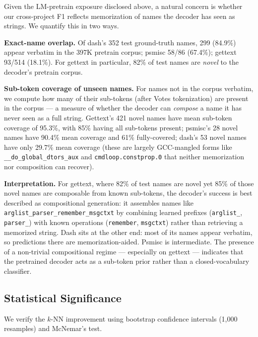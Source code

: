 \documentclass[sigconf,nonacm]{acmart}
\begin{document}
Given the LM-pretrain exposure disclosed above, a natural concern is whether our cross-project F1 reflects memorization of names the decoder has seen as strings. We quantify this in two ways.

\textbf{Exact-name overlap.} Of dash's 352 test ground-truth names, 299 (84.9\%) appear verbatim in the 397K pretrain corpus; psmisc 58/86 (67.4\%); gettext 93/514 (18.1\%). For gettext in particular, 82\% of test names are \emph{novel} to the decoder's pretrain corpus.

\textbf{Sub-token coverage of unseen names.} For names not in the corpus verbatim, we compute how many of their sub-tokens (after Votes tokenization) are present in the corpus --- a measure of whether the decoder can \emph{compose} a name it has never seen as a full string. Gettext's 421 novel names have mean sub-token coverage of 95.3\%, with 85\% having all sub-tokens present; psmisc's 28 novel names have 90.4\% mean coverage and 61\% fully-covered; dash's 53 novel names have only 29.7\% mean coverage (these are largely GCC-mangled forms like \texttt{\_\_do\_global\_dtors\_aux} and \texttt{cmdloop.constprop.0} that neither memorization nor composition can recover).

\textbf{Interpretation.} For gettext, where 82\% of test names are novel yet 85\% of those novel names are composable from known sub-tokens, the decoder's success is best described as compositional generation: it assembles names like \texttt{arglist\_parser\_remember\_msgctxt} by combining learned prefixes (\texttt{arglist\_}, \texttt{parser\_}) with known operations (\texttt{remember}, \texttt{msgctxt}) rather than retrieving a memorized string. Dash sits at the other end: most of its names appear verbatim, so predictions there are memorization-aided. Psmisc is intermediate. The presence of a non-trivial compositional regime --- especially on gettext --- indicates that the pretrained decoder acts as a sub-token prior rather than a closed-vocabulary classifier.

\subsection{Statistical Significance}

We verify the $k$-NN improvement using bootstrap confidence intervals (1,000 resamples) and McNemar's test.
\end{document}
